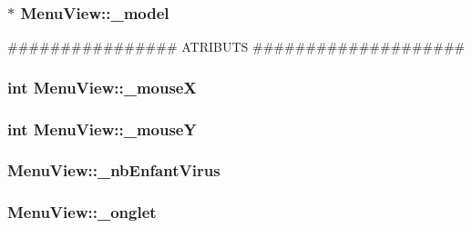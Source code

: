 \label{classMenuView_a908ee4bed6feebc980dd326aa94a686c}
\hypertarget{classMenuView_aacb048b144e056ac0b99569fbaef6ac2}{
\subsubsection[{\_\-model}]{$\ast$ {\bf MenuView::\_\-model}}}
\label{classMenuView_aacb048b144e056ac0b99569fbaef6ac2}


\#\#\#\#\#\#\#\#\#\#\#\#\#\#\#\# ATRIBUTS \#\#\#\#\#\#\#\#\#\#\#\#\#\#\#\#\#\#\#\# 

\hypertarget{classMenuView_a5fac451fc6c45479926b8b00865e38ad}{
\subsubsection[{\_\-mouseX}]{\setlength{\rightskip}{0pt plus 5cm}int {\bf MenuView::\_\-mouseX}}}
\label{classMenuView_a5fac451fc6c45479926b8b00865e38ad}
\hypertarget{classMenuView_a522046f53c6f43686f3dd25193a2e795}{
\subsubsection[{\_\-mouseY}]{\setlength{\rightskip}{0pt plus 5cm}int {\bf MenuView::\_\-mouseY}}}
\label{classMenuView_a522046f53c6f43686f3dd25193a2e795}
\hypertarget{classMenuView_a20a271062852d0a99d8867aff64c1283}{
\subsubsection[{\_\-nbEnfantVirus}]{ {\bf MenuView::\_\-nbEnfantVirus}}}
\label{classMenuView_a20a271062852d0a99d8867aff64c1283}
\hypertarget{classMenuView_a9fcfd5b227056bc52359edb248289e7a}{
\subsubsection[{\_\-onglet}]{ {\bf MenuView::\_\-onglet}}}
